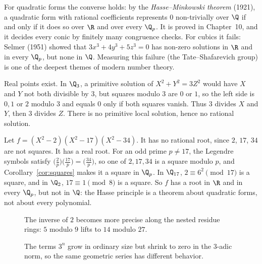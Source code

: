 \begin{remark}
For quadratic forms the converse holds: by the \emph{Hasse--Minkowski theorem} (1921), a quadratic form with rational coefficients represents $0$ non-trivially over $\Q$ if and only if it does so over $\R$ and over every $\Q_p$. It is proved in Chapter~10, and it decides every conic by finitely many congruence checks. For cubics it fails: Selmer (1951) showed that $3x^3+4y^3+5z^3=0$ has non-zero solutions in $\R$ and in every $\Q_p$, but none in $\Q$. Measuring this failure (the Tate--Shafarevich group) is one of the deepest themes of modern number theory.
\end{remark}

\begin{examplex}[$x^2+y^2=3$ over the reals and over $\Q_3$]
Real points exist. In $\Q_3$, a primitive solution of $X^2+Y^2=3Z^2$ would have $X$ and $Y$ not both divisible by $3$, but squares modulo $3$ are $0$ or $1$, so the left side is $0,1$ or $2$ modulo $3$ and equals $0$ only if both squares vanish. Thus $3$ divides $X$ and $Y$, then $3$ divides $Z$. There is no primitive local solution, hence no rational solution.
\end{examplex}

\begin{examplex}
Let $f=(X^2-2)(X^2-17)(X^2-34)$. It has no rational root, since $2$, $17$, $34$ are not squares. It has a real root. For
an odd prime $p\ne17$, the Legendre symbols satisfy $\bigl(\frac2p\bigr)\bigl(\frac{17}p\bigr)=\bigl(\frac{34}p\bigr)$, so one of
$2,17,34$ is a square modulo $p$, and Corollary~\ref{cor:squares} makes it a square in $\Q_p$. In $\Q_{17}$, $2\equiv6^2\pmod{17}$
is a square, and in $\Q_2$, $17\equiv1\pmod8$ is a square. So $f$ has a root in $\R$ and in every $\Q_p$, but not in $\Q$: the
Hasse principle is a theorem about quadratic forms, not about every polynomial.
\end{examplex}

\begin{figure}[ht]
\centering
{}
\caption{The inverse of $2$ becomes more precise along the nested residue rings: $5$ modulo $9$ lifts to $14$ modulo $27$.}
\label{fig:v13-extra-08-a}
\end{figure}

\begin{figure}[ht]
\centering
{}
\caption{The terms $3^n$ grow in ordinary size but shrink to zero in the $3$-adic norm, so the same geometric series has different behavior.}
\label{fig:v13-extra-08-b}
\end{figure}

